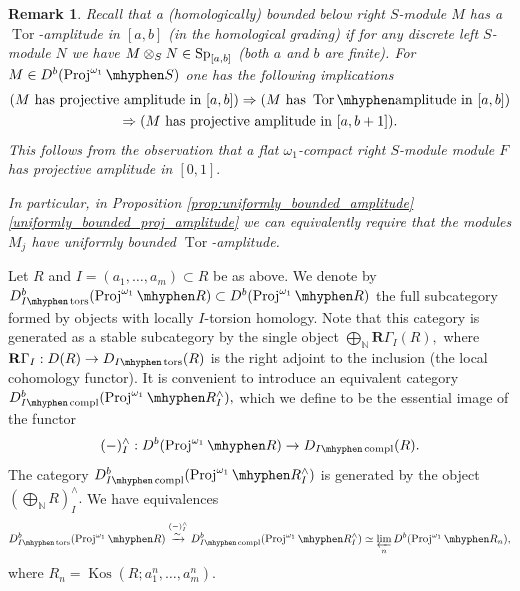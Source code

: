 \documentclass[11pt,leqno]{amsart}
\newtheorem{remark}[theo]{Remark}
\numberwithin{equation}{section}
\def\N{\mathbb{N}}
\def\bR{{\mathbf R}}
\newcommand{\tens}[1]{%
  \mathbin{\mathop{\otimes}\displaylimits_{#1}}%
}
\newcommand{\hy}{\mhyphen}
\newcommand{\prolim}[1][]{\mathop{\varprojlim}\limits_{#1}}
\newcommand{\biggplus}[1][]{\mathop{\bigoplus}\limits_{#1}}
\newcommand{\xto}{\xrightarrow}
\newcommand{\Proj}{\operatorname{Proj}}
\newcommand{\Kos}{\operatorname{Kos}}
\newcommand{\Tor}{\operatorname{Tor}}
\newcommand{\Sp}{\operatorname{Sp}}
\newcommand{\tors}{\operatorname{tors}}
\newcommand{\compl}{\operatorname{compl}}
\begin{document}

\begin{remark}
Recall that a (homologically) bounded below right $S$-module $M$ has a $\Tor$-amplitude in $[a,b]$ (in the homological grading) if for any discrete left $S$-module $N$ we have $M\tens{S}N\in \Sp_{[a,b]}$ (both $a$ and $b$ are finite). For $M\in D^b(\Proj^{\omega_1}\hy S)$ one has the following implications 
\begin{multline*}
(M\text{ has projective amplitude in }[a,b])\Rightarrow (M\text{ has }\Tor\hy\text{amplitude in }[a,b])\\
\Rightarrow(M\text{ has projective amplitude in }[a,b+1]).
\end{multline*}
This follows from the observation that a flat $\omega_1$-compact right $S$-module module $F$ has projective amplitude in $[0,1].$

In particular, in Proposition \ref{prop:uniformly_bounded_amplitude} \ref{uniformly_bounded_proj_amplitude} we can equivalently require that the modules $M_j$ have uniformly bounded $\Tor$-amplitude.
\end{remark}

Let $R$ and $I=(a_1,\dots,a_m)\subset R$ be as above. We denote by $D^b_{I\hy\tors}(\Proj^{\omega_1}\hy R)\subset D^b(\Proj^{\omega_1}\hy R)$ the full subcategory formed by objects with locally $I$-torsion homology. Note that this category is generated as a stable subcategory by the single object $\biggplus[\N]\bR\Gamma_I(R),$ where $\bR\Gamma_I:D(R)\to D_{I\hy \tors}(R)$ is the right adjoint to the inclusion (the local cohomology functor). It is convenient to introduce an equivalent category $D^b_{I\hy\compl}(\Proj^{\omega_1}\hy R^{\wedge}_I),$ which we define to be the essential image of the functor
\begin{equation*}
(-)^{\wedge}_I:D^b(\Proj^{\omega_1}\hy R)\to D_{I\hy\compl}(R).
\end{equation*}
The category $D^b_{I\hy\compl}(\Proj^{\omega_1}\hy R^{\wedge}_I)$ is generated by the object $(\biggplus[\N]R)^{\wedge}_I.$
We have equivalences
\begin{equation*}
D^b_{I\hy\tors}(\Proj^{\omega_1}\hy R)\stackrel{(-)^{\wedge}_I}{\xto{\sim}} D^b_{I\hy\compl}(\Proj^{\omega_1}\hy R^{\wedge}_I)\simeq \prolim[n]D^b(\Proj^{\omega_1}\hy R_n),
\end{equation*}
where $R_n=\Kos(R;a_1^n,\dots,a_m^n).$
\end{document}
